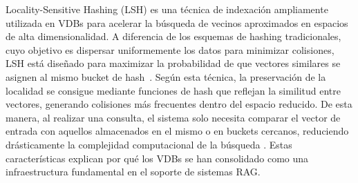 Locality-Sensitive Hashing (LSH) es una técnica de indexación ampliamente utilizada en VDBs para acelerar la búsqueda de vecinos aproximados en espacios de alta 
dimensionalidad. A diferencia de los esquemas de hashing tradicionales, cuyo objetivo es dispersar uniformemente los datos para minimizar colisiones, LSH está diseñado 
para maximizar la probabilidad de que vectores similares se asignen al mismo bucket de hash~\parencite{ma2025vector}. Según esta técnica, la preservación de la localidad
se consigue mediante funciones de hash que reflejan la similitud entre vectores, generando colisiones más frecuentes dentro del espacio reducido. De esta manera, al realizar una 
consulta, el sistema solo necesita comparar el vector de entrada con aquellos almacenados en el mismo o en buckets cercanos, reduciendo drásticamente la complejidad 
computacional de la búsqueda \parencite{ma2025vector}. Estas características explican por qué los VDBs se han consolidado como una infraestructura fundamental en el soporte
de sistemas RAG.


